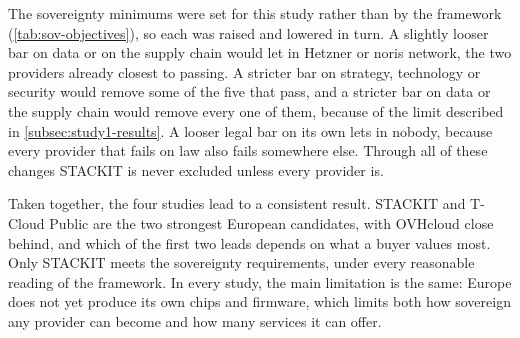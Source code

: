 The sovereignty minimums were set for this study rather than by the framework
(\cref{tab:sov-objectives}), so each was raised and lowered in turn. A slightly
looser bar on data or on the supply chain would let in Hetzner or noris network,
the two providers already closest to passing. A stricter bar on strategy,
technology or security would remove some of the five that pass, and a stricter bar
on data or the supply chain would remove every one of them, because of the limit
described in \cref{subsec:study1-results}. A looser legal bar on its
own lets in nobody, because every provider that fails on law also fails somewhere
else. Through all of these changes STACKIT is never excluded unless every provider
is.

Taken together, the four studies lead to a consistent result. STACKIT and T-Cloud Public
are the two strongest European candidates, with OVHcloud close behind, and which
of the first two leads depends on what a buyer values most. Only STACKIT meets the
sovereignty requirements, under every reasonable reading of the framework. In every study, the main limitation is the same: Europe does not
yet produce its own chips and firmware, which limits both how sovereign any
provider can become and how many services it can offer.
